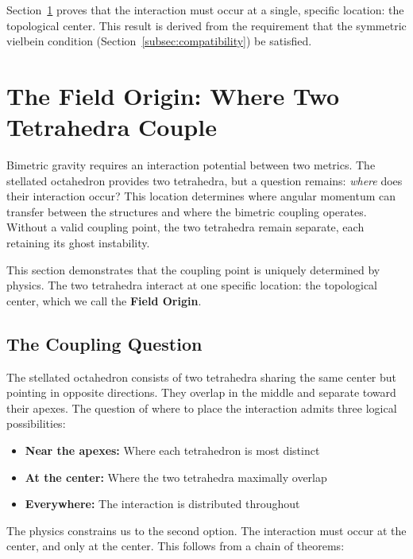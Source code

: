 \documentclass[aps,prd,preprint,superscriptaddress,showpacs,preprintnumbers,amsmath,amssymb,nofootinbib]{revtex4-2}
\begin{document}
Section~\ref{sec:center} proves that the interaction must occur at a single, specific location: the topological center. This result is derived from the requirement that the symmetric vielbein condition (Section~\ref{subsec:compatibility}) be satisfied.

\section{The Field Origin: Where Two Tetrahedra Couple}
\label{sec:center}

Bimetric gravity requires an interaction potential between two metrics. The stellated octahedron provides two tetrahedra, but a question remains: \emph{where} does their interaction occur? This location determines where angular momentum can transfer between the structures and where the bimetric coupling operates. Without a valid coupling point, the two tetrahedra remain separate, each retaining its ghost instability.

This section demonstrates that the coupling point is uniquely determined by physics. The two tetrahedra interact at one specific location: the topological center, which we call the \textbf{Field Origin}.

\subsection{The Coupling Question}
\label{subsec:coupling-question}

The stellated octahedron consists of two tetrahedra sharing the same center but pointing in opposite directions. They overlap in the middle and separate toward their apexes. The question of where to place the interaction admits three logical possibilities:

\begin{itemize}
\item \textbf{Near the apexes:} Where each tetrahedron is most distinct
\item \textbf{At the center:} Where the two tetrahedra maximally overlap
\item \textbf{Everywhere:} The interaction is distributed throughout
\end{itemize}

The physics constrains us to the second option. The interaction must occur at the center, and only at the center. This follows from a chain of theorems:
\end{document}
